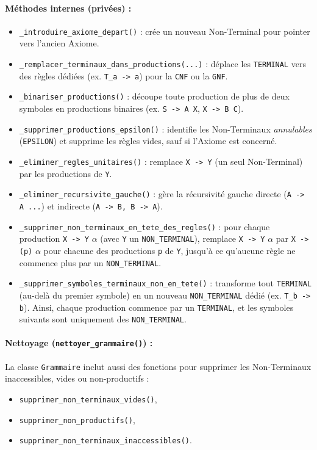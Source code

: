 \documentclass[a4paper,12pt]{article}
\begin{document}
\paragraph{Méthodes internes (privées) :}
\begin{itemize}
    \item \texttt{\_introduire\_axiome\_depart()} : crée un nouveau Non-Terminal pour pointer vers l’ancien Axiome.
    \item \texttt{\_remplacer\_terminaux\_dans\_productions(...)} : déplace les \texttt{TERMINAL} vers des règles dédiées (ex. \texttt{T\_a -> a}) pour la \texttt{CNF} ou la \texttt{GNF}.
    \item \texttt{\_binariser\_productions()} : découpe toute production de plus de deux symboles en productions binaires (ex. \texttt{S -> A X}, \texttt{X -> B C}).
    \item \texttt{\_supprimer\_productions\_epsilon()} : identifie les Non-Terminaux \emph{annulables} (\texttt{EPSILON}) et supprime les règles vides, sauf si l’Axiome est concerné.
    \item \texttt{\_eliminer\_regles\_unitaires()} : remplace \texttt{X -> Y} (un seul Non-Terminal) par les productions de \texttt{Y}.
    \item \texttt{\_eliminer\_recursivite\_gauche()} : gère la récursivité gauche directe (\texttt{A -> A ...}) et indirecte (\texttt{A -> B, B -> A}).
    \item \texttt{\_supprimer\_non\_terminaux\_en\_tete\_des\_regles()} : pour chaque production \texttt{X -> Y} $\alpha$ (avec \texttt{Y} un \texttt{NON\_TERMINAL}), remplace \texttt{X -> Y} $\alpha$ par \texttt{X -> (p)} $\alpha$ pour chacune des productions \texttt{p} de \texttt{Y},  jusqu’à ce qu’aucune règle ne commence plus par un \texttt{NON\_TERMINAL}.
    \item \texttt{\_supprimer\_symboles\_terminaux\_non\_en\_tete()} : transforme tout \texttt{TERMINAL} (au-delà du premier symbole) en un nouveau \texttt{NON\_TERMINAL} dédié (ex. \texttt{T\_b -> b}). Ainsi, chaque production commence par un \texttt{TERMINAL}, et les symboles suivants sont uniquement des \texttt{NON\_TERMINAL}.
\end{itemize}


\paragraph{Nettoyage (\texttt{nettoyer\_grammaire()}) :}
La classe \texttt{Grammaire} inclut aussi des fonctions pour supprimer les Non-Terminaux inaccessibles, vides ou non-productifs :  
\begin{itemize}
    \item \texttt{supprimer\_non\_terminaux\_vides()},
    \item \texttt{supprimer\_non\_productifs()},
    \item \texttt{supprimer\_non\_terminaux\_inaccessibles()}.
\end{itemize}
\end{document}
